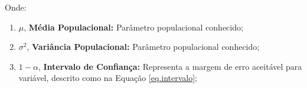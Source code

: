 \documentclass{article}
\begin{document}
            Onde:
                \begin{enumerate}[rightmargin = \leftmargin, noitemsep]
                    \item $\mu$, \textbf{Média Populacional:} Parâmetro populacional conhecido;

                    \item $\sigma^{2}$, \textbf{Variância Populacional:} Parâmetro populacional conhecido;

                    \item $1-\alpha$, \textbf{Intervalo de Confiança:} Representa a margem de erro aceitável para variável, descrito como na Equação \ref{eq.intervalo};
                \end{enumerate}
\end{document}
